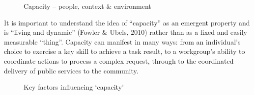 \documentclass[
  10pt,
]{report}
\begin{document}
\begin{figure}[H]

\caption{\label{fig-Capacity-people-context-environment}Capacity --
people, context \& environment}


\end{figure}%

It is important to understand the idea of ``capacity'' as an emergent
property and is ``living and dynamic'' (Fowler \& Ubels, 2010) rather
than as a fixed and easily measurable ``thing''. Capacity can manifest
in many ways: from an individual's choice to exercise a key skill to
achieve a task result, to a workgroup's ability to coordinate actions to
process a complex request, through to the coordinated delivery of public
services to the community.

\begin{figure}[H]

\caption{\label{fig-factors-influencing-capacity}Key factors influencing
`capacity'}


\end{figure}%
\end{document}
